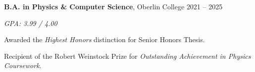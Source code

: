 \begin{entry}
	{{\bf B.A. in Physics \& Computer Science}, Oberlin College}
	{2021 -- 2025}

	{\em GPA: 3.99 / 4.00}

	Awarded the {\em Highest Honors} distinction for Senior Honors Thesis.

	Recipient of the Robert Weinstock Prize for {\em Outstanding Achievement in Physics Coursework}.
\end{entry}
